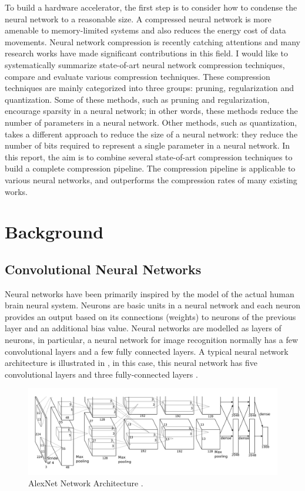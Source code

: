 \documentclass[a4paper,12pt]{report}
\begin{document}
To build a hardware accelerator, the first step is to consider how to condense
the neural network to a reasonable size.
A compressed neural network is more amenable to memory-limited systems and also
reduces the energy cost of data movements.
Neural network compression is recently catching attentions and many research
works have made significant contributions in this field.
I would like to systematically summarize state-of-art neural network compression
techniques, compare and evaluate various compression techniques.
These compression techniques are mainly categorized into three groups:
pruning, regularization and quantization.
Some of these methods, such as pruning and regularization, encourage sparsity
in a neural network; in other words, these methods reduce the number of parameters
in a neural network.
Other methods, such as quantization, takes a different approach to reduce the size of
a neural network: they reduce the number of bits required to represent a single
parameter in a neural network.
In this report, the aim is to combine several state-of-art compression techniques
to build a complete compression pipeline.
The compression pipeline is applicable to various neural networks, and outperforms
the compression rates of many existing works.

\chapter{Background}

\section{Convolutional Neural Networks}
Neural networks have been primarily inspired by the model of the actual human brain
neural system.
Neurons are basic units in a neural network and each neuron provides an output
based on its connections (weights) to neurons of the previous layer and an additional
bias value.
Neural networks are modelled as layers of neurons, in particular, a neural network
for image recognition normally has a few convolutional layers and a few fully
connected layers.
A typical neural network architecture is illustrated in ,
in this case, this neural network has five convolutional layers and three fully-connected
layers \cite{Krizhevsky}.
\begin{figure}[!h]
  \includegraphics[width=\textwidth]{fig_alexnet.png}
  \caption{AlexNet Network Architecture \cite{Krizhevsky}.}
  \label{fig:alexnet}
\end{figure}
\end{document}
